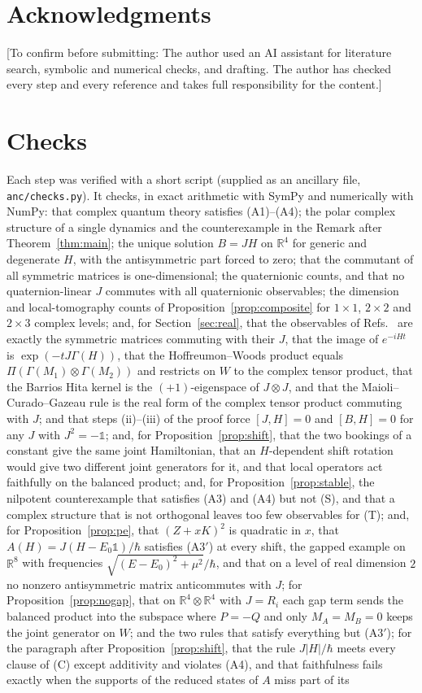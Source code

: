\documentclass[11pt]{article}
\theoremstyle{remark}
\newcommand{\R}{\mathbb{R}}
\newcommand{\one}{\mathbb{1}}
\begin{document}
\section*{Acknowledgments}
[To confirm before submitting: The author used an AI assistant for literature search, symbolic and numerical checks, and drafting. The author has checked every step and every reference and takes full responsibility for the content.]

\appendix
\section{Checks}
Each step was verified with a short script (supplied as an ancillary file, \texttt{anc/checks.py}). It checks, in exact arithmetic with SymPy and numerically with NumPy: that complex quantum theory satisfies (A1)--(A4); the polar complex structure of a single dynamics and the counterexample in the Remark after Theorem~\ref{thm:main}; the unique solution $B=JH$ on $\R^4$ for generic and degenerate $H$, with the antisymmetric part forced to zero; that the commutant of all symmetric matrices is one-dimensional; the quaternionic counts, and that no quaternion-linear $J$ commutes with all quaternionic observables; the dimension and local-tomography counts of Proposition~\ref{prop:composite} for $1\times1$, $2\times2$ and $2\times3$ complex levels; and, for Section~\ref{sec:real}, that the observables of Refs.~\cite{HoffreumonWoods,BarriosHita} are exactly the symmetric matrices commuting with their $J$, that the image of $e^{-iHt}$ is $\exp(-tJ\Gamma(H))$, that the Hoffreumon--Woods product equals $\Pi(\Gamma(M_1)\otimes\Gamma(M_2))$ and restricts on $W$ to the complex tensor product, that the Barrios Hita kernel is the $(+1)$-eigenspace of $J\otimes J$, and that the Maioli--Curado--Gazeau rule is the real form of the complex tensor product commuting with $J$; and that steps (ii)--(iii) of the proof force $[J,H]=0$ and $[B,H]=0$ for any $J$ with $J^2=-\one$; and, for Proposition~\ref{prop:shift}, that the two bookings of a constant give the same joint Hamiltonian, that an $H$-dependent shift rotation would give two different joint generators for it, and that local operators act faithfully on the balanced product; and, for Proposition~\ref{prop:stable}, the nilpotent counterexample that satisfies (A3) and (A4) but not (S), and that a complex structure that is not orthogonal leaves too few observables for (T); and, for Proposition~\ref{prop:pe}, that $(Z+xK)^2$ is quadratic in $x$, that $A(H)=J(H-E_0\one)/\hbar$ satisfies (A3$'$) at every shift, the gapped example on $\R^8$ with frequencies $\sqrt{(E-E_0)^2+\mu^2}/\hbar$, and that on a level of real dimension $2$ no nonzero antisymmetric matrix anticommutes with $J$; for Proposition~\ref{prop:nogap}, that on $\R^4\otimes\R^4$ with $J=R_i$ each gap term sends the balanced product into the subspace where $P=-Q$ and only $M_A=M_B=0$ keeps the joint generator on $W$; and the two rules that satisfy everything but (A3$'$); for the paragraph after Proposition~\ref{prop:shift}, that the rule $J|H|/\hbar$ meets every clause of (C) except additivity and violates (A4), and that faithfulness fails exactly when the supports of the reduced states of $A$ miss part of its 
\end{document}
